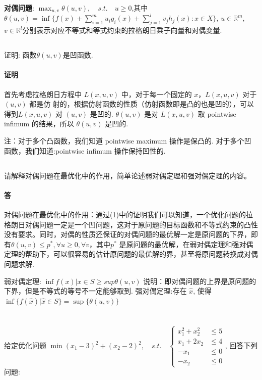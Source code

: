 \documentclass[a4paper]{article}
\begin{document}
\textbf{对偶问题}: 
\(\max_{u,v}\theta(u,v),\quad s.t.\quad u \geq 0\),其中\(\theta(u,v) = \inf\{f(x)+\sum_{i=1}^m u_i g_i (x) + \sum^l_{j=1}v_j h_j(x) : x \in X\}\), \(u \in \mathbb{R}^m\),\(v \in \mathbb{R}^l\)分别表示对应不等式和等式约束的拉格朗日乘子向量和对偶变量.

\subsection{}
证明: 函数\(\theta(u,v)\)是凹函数.

\paragraph{证明}
首先考虑拉格朗日方程中 $L(x,u,v)$ 中，对于每一个固定的 $x$，$L(x,u,v)$ 对于 $(u,v)$ 都是仿
射的，根据仿射函数的性质（仿射函数即是凸的也是凹的），可以得到$L(x,u,v)$ 对 $(u,v)$ 是凹的.
 $\theta(u,v)$ 是对 $L(x,u,v)$ 取 pointwise infimum 的结果，所以 $\theta(u,v)$ 是凹的.

注：对于多个凸函数，我们知道 pointwise maximum 操作是保凸的. 对于多个凹函数，我们知道:pointwise infimum 操作保持凹性的.

\subsection{}
请解释对偶问题在最优化中的作用，简单论述弱对偶定理和强对偶定理的内容。

\paragraph{答}
对偶问题在最优化中的作用：通过(1)中的证明我们可以知道，一个优化问题的拉格朗日对偶问题一定是一个凹问题，这对于原问题的目标函数和不等式约束的凸性没有要求。同时，对偶的性质还保证的对偶问题的最优解一定是原问题的下界，即有$\theta(u,v)\leq p^*,\forall u\geq0, \forall v$，其中$p^*$ 是原问题的最优解，在弱对偶定理和强对偶定理的帮助下，可以很容易的估计原问题的最优解的界，甚至将原问题转换成对偶问题求解.

弱对偶定理: $\inf{f(x)|x \in S} \geq sup{\theta(u,v)}$
说明：即对偶问题的上界是原问题的下界，但是不等式的等号不一定能够取到.
强对偶定理:存在 $ \hat{x}$, 使得$\inf\{f( \hat{x})| \hat{x} \in S\} = \sup\{\theta(u,v)\}$

\section{}
给定优化问题 \(\min (x_1-3)^2+(x_2 -2)^2, \quad s.t. \quad \left\{\begin{array}{cl}
   x_1^2 + x_2^2 & \leq 5\\
   x_1 + 2x_2 & \leq 4 \\
   -x_1 & \leq 0\\
   -x_2 & \leq 0
\end{array}\right.\), 回答下列问题:
\end{document}
